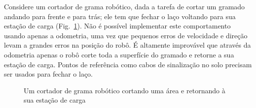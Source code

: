 
Considere um cortador de grama robótico, dada a tarefa de cortar um gramado andando para frente e para trás; ele tem que fechar o laço voltando para sua estação de carga (Fig.~\ref{fig.lawn}). Não é possível implementar este comportamento usando apenas a odometria, uma vez que pequenos erros de velocidade e direção levam a grandes erros na posição do robô. É altamente improvável que através da odometria apenas o robô corte toda a superfície do gramado e retorne a sua estação de carga. Pontos de referência como cabos de sinalização no solo precisam ser usados para fechar o laço.

\begin{figure}
\begin{center}
\end{center}
\caption{Um cortador de grama robótico cortando uma área e retornando à sua estação de carga}\label{fig.lawn}
\end{figure}

